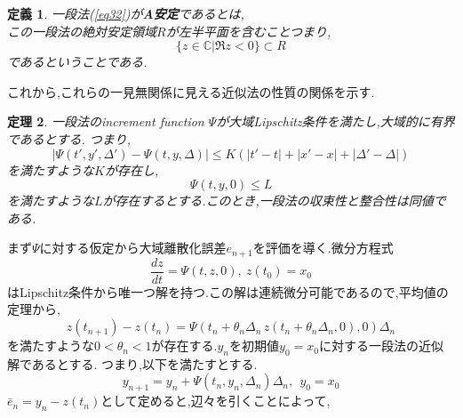 \documentclass[a4paper]{jreport}
\def\qedsymbol{$\square$}
\def\proofname{\gt{証明}\;}
\newenvironment{Proof}{\par\noindent{\it\proofname}}{{\unskip\nobreak\hfill{\it\qedsymbol}}\par\vskip 9pt}
\numberwithin{equation}{section}
\newtheorem{Thm}     {定理}[section]
\newtheorem{Def}     [Thm]{定義}
\renewenvironment{leftbar}{%
  \def\FrameCommand{\vrule width 1pt \hspace{10pt}}%
  \MakeFramed {\advance\hsize-\width \FrameRestore}}%
 {\endMakeFramed}
\def\C{\mathbb C}
\def\thm{\begin{leftbar}\begin{Thm}}
\def\thmx{\end{Thm}\end{leftbar}}
\def\defb{\begin{leftbar}\begin{Def}}
\def\defx{\end{Def}\end{leftbar}}
\def\proof{\begin{Proof}}
\begin{document}
\defb
一段法(\ref{eq32})が{\bf A安定}であるとは,\\
この一段法の絶対安定領域$R$が左半平面を含むことつまり,
\[
\{z \in \C | \Re z < 0 \} \subset R
\]
であるということである.
\defx
これから,これらの一見無関係に見える近似法の性質の関係を示す.
\thm
一段法のincrement function $\Psi$が大域Lipschitz条件を満たし,大域的に有界であるとする.
つまり,
\[
|\Psi(t',y',\Delta') -\Psi(t,y,\Delta)| \le K (|t'-t| + |x'-x| + |\Delta' - \Delta|)
\]
を満たすような$K$が存在し,
\[
\Psi(t,y,0) \le L
\]
を満たすような$L$が存在するとする.このとき,一段法の収束性と整合性は同値である.
\thmx
\proof
まず$\Psi$に対する仮定から大域離散化誤差$e_{n+1}$を評価を導く.微分方程式
\[
\frac{dz}{dt} = \Psi(t,z,0) ,\ z(t_0) = x_0
\]
はLipschitz条件から唯一つ解を持つ.この解は連続微分可能であるので,平均値の定理から,
\[
z(t_{n+1}) - z(t_n) = \Psi(t_n+\theta_n\Delta_n \,z(t_n+\theta_n\Delta_n,0),0) \Delta_n
\]
を満たすような$0 < \theta_n < 1$が存在する.$y_n$を初期値$y_0 = x_0$に対する一段法の近似解であるとする.
つまり,以下を満たすとする.
\[
y_{n+1} = y_n + \Psi(t_n,y_n,\Delta_n) \Delta_n,\  \  y_0 = x_0
\]
$\bar{e}_{n} = y_n - z(t_n)$として定めると,辺々を引くことによって,
\end{document}
